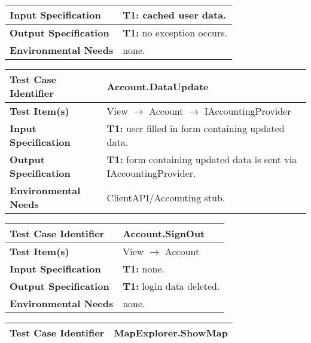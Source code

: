 {\begin{tabularx}{\textwidth}{l X}
    \textbf{Input Specification} & \textbf{T1:} cached user data.\\
    \hline 
    
    \textbf{Output Specification} & \textbf{T1:} no exception occurs.\\
    \hline 
    
    \textbf{Environmental Needs} & none.\\
    \hline
\end{tabularx}
\bigskip 

\noindent
\begin{tabularx}{\textwidth}{l X}
    \hline 
    \textbf{Test Case Identifier} & Account.DataUpdate\\ 
    \hline 
    
    \textbf{Test Item(s)} & View $\rightarrow$ Account $\rightarrow$ IAccountingProvider\\
    \hline 
    
    \textbf{Input Specification}  & \textbf{T1:} user filled in form containing updated data.\\
    \hline 
    
    \textbf{Output Specification} & \textbf{T1:} form containing updated data is sent via IAccountingProvider.\\
    \hline 
    
    \textbf{Environmental Needs} & ClientAPI/Accounting stub.\\
    \hline
\end{tabularx}
\bigskip 

\noindent
\begin{tabularx}{\textwidth}{l X}
    \hline 
    \textbf{Test Case Identifier} & Account.SignOut\\ 
    \hline 
    
    \textbf{Test Item(s)} & View $\rightarrow$ Account\\
    \hline 
    
    \textbf{Input Specification}  & \textbf{T1:} none.\\
    \hline 
    
    \textbf{Output Specification} & \textbf{T1:} login data deleted.\\
    \hline 
    
    \textbf{Environmental Needs} & none.\\
    \hline
\end{tabularx}
\bigskip 


\noindent
\begin{tabularx}{\textwidth}{l X}
    \hline 
    \textbf{Test Case Identifier} & MapExplorer.ShowMap\\ 
    \hline 
    

\end{tabularx}}
